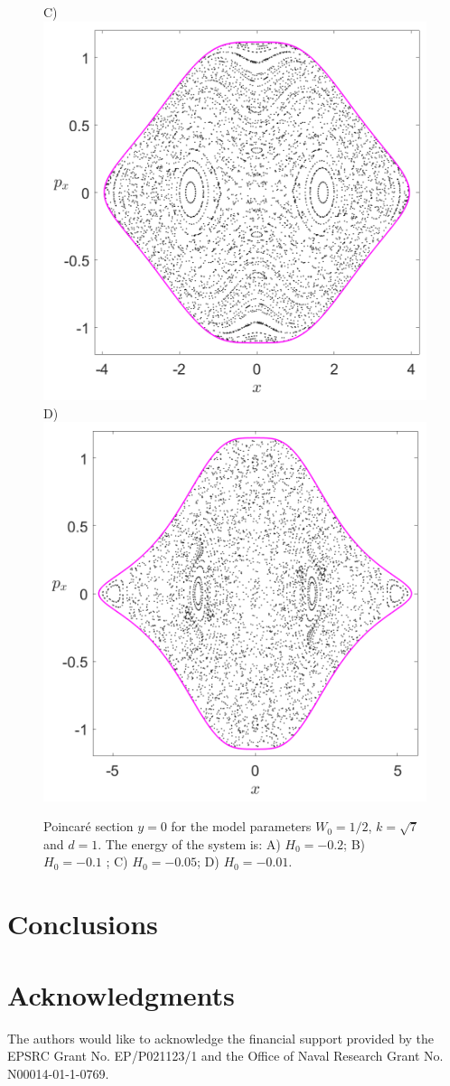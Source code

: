 \documentclass[10pt,aps,onecolumn,superscriptaddress]{revtex4-2}
\begin{document}
\begin{figure}[htbp]
	C)\includegraphics[scale=0.3]{PS_cirque_H_-0_05_y_0_w0_1div2_d_1_k_sqrt7.png}
	D)\includegraphics[scale=0.3]{PS_cirque_H_-0_01_y_0_w0_1div2_d_1_k_sqrt7.png}
	\caption{Poincar\'e section $y = 0$ for the model parameters $W_0 = 1/2$, $k = \sqrt{7}$ and $d = 1$. The energy of the system is: A) $H_0 = -0.2$; B) $H_0 = -0.1$ ; C) $H_0 = -0.05$; D) $H_0 = -0.01$.}
	\label{fig:psec_y_0_bif}
\end{figure}


\section{Conclusions}
\label{sec:conclusion}

\section*{Acknowledgments}
The authors would like to acknowledge the financial support provided by the EPSRC Grant No. EP/P021123/1 and the Office of Naval Research Grant No. N00014-01-1-0769.


\end{document}
